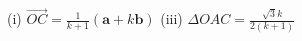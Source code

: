 \item (i) $\overrightarrow{OC}=\frac{1}{k+1}(\mathbf{a}+k\mathbf{b})$ (iii)
$\Delta OAC=\frac{\sqrt{3}k}{2(k+1)}$